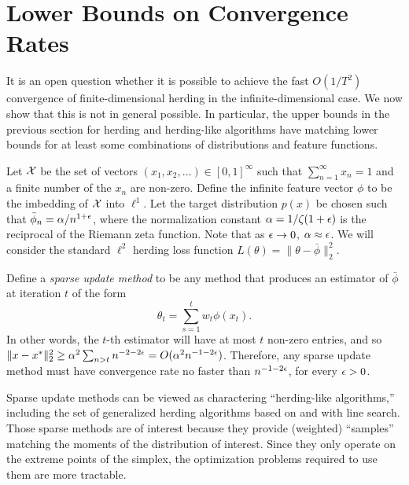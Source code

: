 \documentclass[paper.tex]{subfiles}
\begin{document}
\section{Lower Bounds on Convergence Rates}
\label{sec:lower-bounds}

It is an open question whether it is possible to achieve the fast $O(1/T^{2})$ convergence of finite-dimensional herding in the infinite-dimensional case. We now show that this is not in general possible. In particular, the upper bounds in the previous section for herding and herding-like algorithms have matching lower bounds for at least some combinations of distributions and feature functions. 

Let $\mathcal{X}$ be the set of vectors $(x_{1},x_{2},\dots) \in [0,1]^{\infty}$ such that $\sum_{n=1}^{\infty} x_{n} = 1$ and a finite number of the $x_{n}$ are non-zero. Define the infinite feature vector $\phi$ to be the imbedding of $\mathcal{X}$ into $\ell^{1}$. Let the target distribution $p(x)$ be chosen such that $\bar\phi_{n} = \alpha/n^{1+\epsilon}$, where the normalization constant $\alpha = 1/\zeta(1 + \epsilon)$ is the reciprocal of the Riemann zeta function. Note that as $\epsilon \to 0$, $\alpha \approx \epsilon$. We will consider the standard $\ell^{2}$ herding loss function $L(\theta) = \|\theta - \bar \phi\|_2^2$. 

Define a {\em sparse update method} to be any method that produces an estimator of $\bar \phi$ at iteration $t$ of the form 
\[
\theta_{t} = \sum_{s =1}^{t}w_{t} \phi(x_{t}).
\]
In other words, the $t$-th estimator will have at most $t$ non-zero entries, and so $\|x-x^{*}\|_2^2 \ge \alpha^{2}\sum_{n > t} n^{-2-2\epsilon} = O(\alpha^{2}n^{-1-2\epsilon})$. Therefore, any sparse update method must have convergence rate no faster than $n^{-1-2\epsilon}$, for every $\epsilon > 0$. 

Sparse update methods can be viewed as charactering ``herding-like algorithms,'' including the set of generalized herding algorithms based on  and  with line search. Those sparse methods are of interest because they provide (weighted) ``samples'' matching the moments of the distribution of interest. Since they only operate on the extreme points of the simplex, the optimization problems required to use them are more tractable. 
\end{document}
